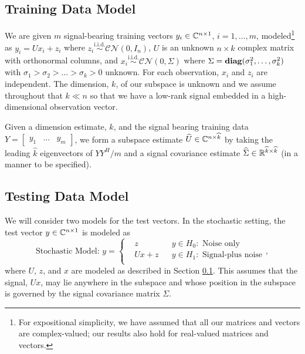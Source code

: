 \subsection{Training Data Model}\label{sec:training_data}We are given
  $m$ signal-bearing training vectors $y_i\in \mathbb{C}^{n\times 1}$, $i=1,\dots,m$, modeled\footnote{For expositional simplicity, we have assumed that all our matrices and vectors are complex-valued; our results also hold for real-valued matrices and vectors.} as $y_i=Ux_i+z_i$ where $z_i\overset{\text{i.i.d.}}{\sim}\mathcal{CN}(0,I_n)$, $U$ is an unknown $n\times k$ complex matrix with orthonormal columns, and $x_i\overset{\text{i.i.d.}}{\sim}\mathcal{CN}(0,\Sigma)$ where $\Sigma=\mathop{\bf diag}(\sigma_1^2,\dots,\sigma_k^2)$ with $\sigma_1>\sigma_2>\dots>\sigma_k>0$ unknown. For each observation, $x_i$ and $z_i$ are independent. The dimension, $k$, of our subspace is unknown and we assume throughout that $k\ll n$ so that we have a low-rank signal embedded in a high-dimensional observation vector.

  Given a dimension estimate, $\widehat{k}$, and the signal bearing training data $Y = \begin{bmatrix} y_1 & \dots & y_m \end{bmatrix}$, we form a subspace estimate $\widehat{U}\in\mathbb{C}^{n\times\widehat{k}}$ by taking the leading $\widehat{k}$ eigenvectors of $YY^{H}/m$ and a signal covariance estimate $\widehat{\Sigma}\in\mathbb{R}^{\widehat{k}\times\widehat{k}}$ (in a manner to be specified).

\subsection{Testing Data Model}
We will consider two models for the test vectors. In the stochastic setting, the test vector $y\in\mathbb{C}^{n\times 1}$ is modeled as
\begin{equation}\label{eq:stoch_setup}
\text{Stochastic Model: }y=\left\{
\begin{aligned}
&z
&& y\in H_0:\text{ Noise only}\\
&Ux+z
&& y\in H_1:\text{ Signal-plus noise}\\
\end{aligned}\right. ,
\end{equation}
where $U$, $z$, and $x$ are modeled as described in Section \ref{sec:training_data}. This assumes that the signal, $Ux$, may lie anywhere in the subspace and whose position in the subspace is governed by the signal covariance matrix $\Sigma$.

